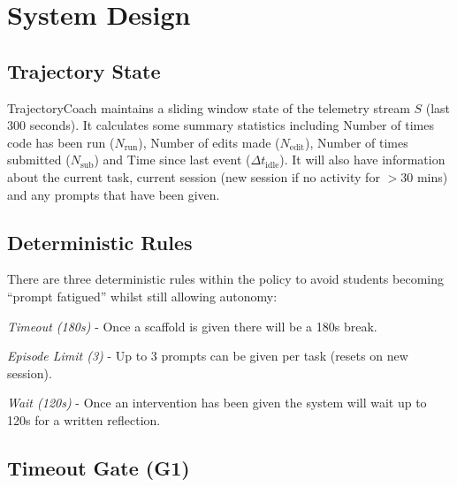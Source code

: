 \documentclass[conference]{IEEEtran}
\begin{document}
\section{System Design}

\subsection{Trajectory State}

TrajectoryCoach maintains a sliding window state of the telemetry stream $S$ (last 300 seconds). It calculates some summary statistics including Number of times code has been run ($N_{\text{run}}$), Number of edits made ($N_{\text{edit}}$), Number of times submitted ($N_{\text{sub}}$) and Time since last event ($\Delta t_{\text{idle}}$). It will also have information about the current task, current session (new session if no activity for $>$30 mins) and any prompts that have been given.

\subsection{Deterministic Rules}

There are three deterministic rules within the policy to avoid students becoming ``prompt fatigued'' whilst still allowing autonomy:

\textit{Timeout (180s)} - Once a scaffold is given there will be a 180s break.

\textit{Episode Limit (3)} - Up to 3 prompts can be given per task (resets on new session).

\textit{Wait (120s)} - Once an intervention has been given the system will wait up to 120s for a written reflection.

\subsection{Timeout Gate (G1)}
\end{document}
